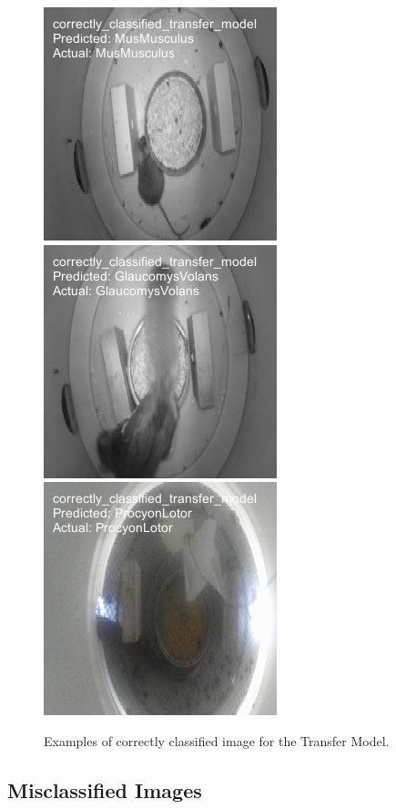 \documentclass[a4paper,12pt]{article}
\begin{document}
\begin{figure}[H]
    \centering
    \includegraphics[width=0.3\linewidth]{results/correctly_classified_transfer_model_image_260.png}
    \includegraphics[width=0.3\linewidth]{results/correctly_classified_transfer_model_image_81.png}
    \includegraphics[width=0.3\linewidth]{results/correctly_classified_transfer_model_image_1.png}
    \caption{Examples of correctly classified image for the Transfer Model.}
\end{figure}

\subsection{Misclassified Images}
\end{document}
